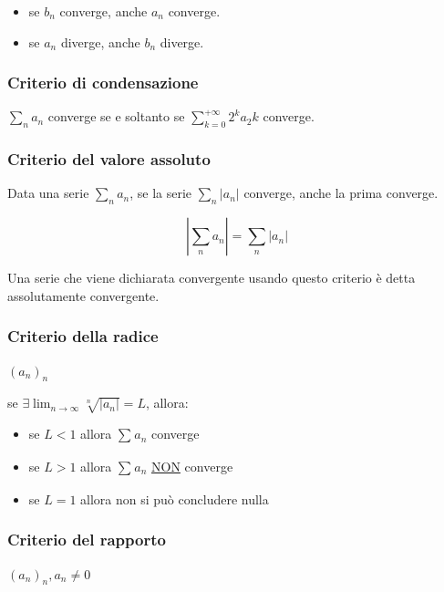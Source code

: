 \documentclass{article}
\begin{document}
\begin{itemize}
    \item se $b_n$ converge, anche $a_n$ converge.
    \item se $a_n$ diverge, anche $b_n$ diverge.
\end{itemize}

\subsubsection{Criterio di condensazione}

$\sum_{n}^{} a_n$ converge se e soltanto se $\sum_{k = 0}^{+\infty} 2^k a_2k$ converge.

\subsubsection{Criterio del valore assoluto}

Data una serie $\sum_{n}^{} a_n$, se la serie $\sum_{n}^{} |a_n|$ converge, anche la prima converge.

\begin{equation}
    |\sum_{n}^{} a_n| = \sum_{n}^{} |a_n|
\end{equation}

\noindent
Una serie che viene dichiarata convergente usando questo
criterio è detta assolutamente convergente.

\subsubsection{Criterio della radice}

$(a_n)_n$

\vspace{5mm}
\noindent
se $\exists \lim_{n \to \infty} \sqrt[n]{|a_n|} = L$, allora:

\begin{itemize}
    \item se $L < 1$ allora $\sum_{}^{} a_n$ converge
    \item se $L > 1$ allora $\sum_{}^{} a_n$ \underline{NON} converge
    \item se $L = 1$ allora non si può concludere nulla
\end{itemize}

\subsubsection{Criterio del rapporto}

$(a_n)_n, a_n \neq 0$
\end{document}
